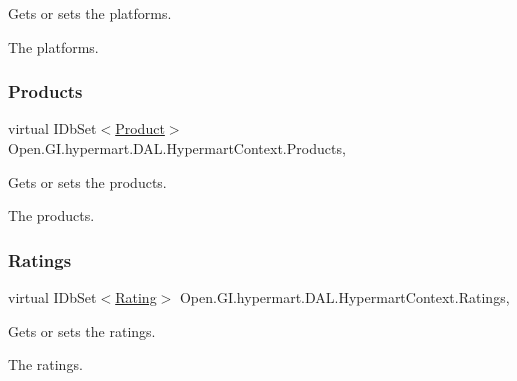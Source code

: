 Gets or sets the platforms. 

The platforms. \hypertarget{class_open_1_1_g_i_1_1hypermart_1_1_d_a_l_1_1_hypermart_context_a0f25e3272e2504f80b53a8291ba7920e}{}\label{class_open_1_1_g_i_1_1hypermart_1_1_d_a_l_1_1_hypermart_context_a0f25e3272e2504f80b53a8291ba7920e} 
\subsubsection{\texorpdfstring{Products}{Products}}
{\footnotesize\ttfamily virtual I\+Db\+Set$<$\hyperlink{class_open_1_1_g_i_1_1hypermart_1_1_models_1_1_product}{Product}$>$ Open.\+G\+I.\+hypermart.\+D\+A\+L.\+Hypermart\+Context.\+Products\hspace{0.3cm}{\ttfamily [get]}, {\ttfamily [set]}}



Gets or sets the products. 

The products. \hypertarget{class_open_1_1_g_i_1_1hypermart_1_1_d_a_l_1_1_hypermart_context_a70dcf8c6d47caf1bfdad2073e31dcb02}{}\label{class_open_1_1_g_i_1_1hypermart_1_1_d_a_l_1_1_hypermart_context_a70dcf8c6d47caf1bfdad2073e31dcb02} 
\subsubsection{\texorpdfstring{Ratings}{Ratings}}
{\footnotesize\ttfamily virtual I\+Db\+Set$<$\hyperlink{class_open_1_1_g_i_1_1hypermart_1_1_models_1_1_rating}{Rating}$>$ Open.\+G\+I.\+hypermart.\+D\+A\+L.\+Hypermart\+Context.\+Ratings\hspace{0.3cm}{\ttfamily [get]}, {\ttfamily [set]}}



Gets or sets the ratings. 

The ratings. \hypertarget{class_open_1_1_g_i_1_1hypermart_1_1_d_a_l_1_1_hypermart_context_af81b06ad6509a480c430f3f1c1d66c59}{}\label{class_open_1_1_g_i_1_1hypermart_1_1_d_a_l_1_1_hypermart_context_af81b06ad6509a480c430f3f1c1d66c59} 
